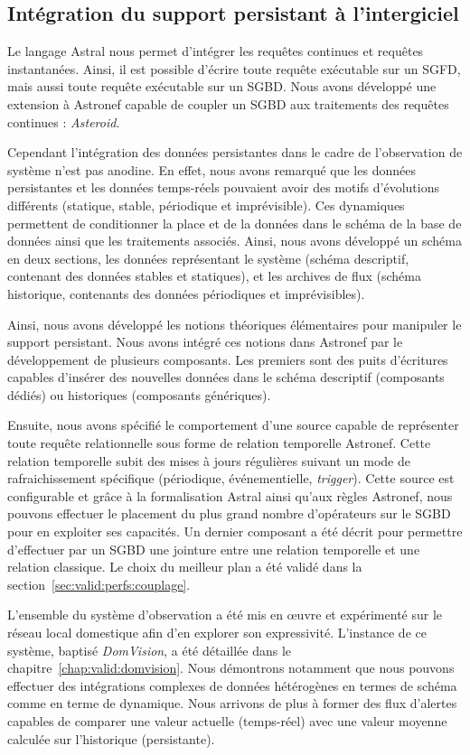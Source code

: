 \subsection{Intégration du support persistant à l'intergiciel}
Le langage Astral nous permet d'intégrer les requêtes continues et requêtes instantanées. Ainsi, il est possible d'écrire toute requête exécutable sur un SGFD, mais aussi toute requête exécutable sur un SGBD. Nous avons développé une extension à Astronef capable de coupler un SGBD aux traitements des requêtes continues : \textit{Asteroid}.

Cependant l'intégration des données persistantes dans le cadre de l'observation de système n'est pas anodine. En effet, nous avons remarqué que les données persistantes et les données temps-réels pouvaient avoir des motifs d'évolutions différents (statique, stable, périodique et imprévisible). Ces dynamiques permettent de conditionner la place et de la données dans le schéma de la base de données ainsi que les traitements associés. Ainsi, nous avons développé un schéma en deux sections, les données représentant le système (schéma descriptif, contenant des données stables et statiques), et les archives de flux (schéma historique, contenants des données périodiques et imprévisibles).

Ainsi, nous avons développé les notions théoriques élémentaires pour manipuler le support persistant. Nous avons intégré ces notions dans Astronef par le développement de plusieurs composants. Les premiers sont des puits d'écritures capables d'insérer des nouvelles données dans le schéma descriptif (composants dédiés) ou historiques (composants génériques).

Ensuite, nous avons spécifié le comportement d'une source capable de représenter toute requête relationnelle sous forme de relation temporelle Astronef. Cette relation temporelle subit des mises à jours régulières suivant un mode de rafraichissement spécifique (périodique, événementielle, \textit{trigger}). Cette source est configurable et grâce à la formalisation Astral ainsi qu'aux règles Astronef, nous pouvons effectuer le placement du plus grand nombre d'opérateurs sur le SGBD pour en exploiter ses capacités. Un dernier composant a été décrit pour permettre d'effectuer par un SGBD une jointure entre une relation temporelle et une relation classique. Le choix du meilleur plan a été validé dans la section~\ref{sec:valid:perfs:couplage}.

L'ensemble du système d'observation a été mis en œuvre et expérimenté sur le réseau local domestique afin d'en explorer son expressivité. L'instance de ce système, baptisé \textit{DomVision}, a été détaillée dans le chapitre~\ref{chap:valid:domvision}. Nous démontrons notamment que nous pouvons effectuer des intégrations complexes de données hétérogènes en termes de schéma comme en terme de dynamique. Nous arrivons de plus à former des flux d'alertes capables de comparer une valeur actuelle (temps-réel) avec une valeur moyenne calculée sur l'historique (persistante).